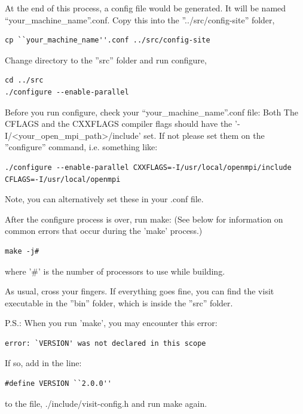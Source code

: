 \documentclass[12pt]{article}
\begin{document}
At the end of this process, a config file would be generated. It will
be named ``your\_machine\_name''.conf. Copy this into the
''../src/config-site'' folder,

\begin{verbatim}
cp ``your_machine_name''.conf ../src/config-site
\end{verbatim}

Change directory to the ''src'' folder and run configure,

\begin{verbatim}
cd ../src
./configure --enable-parallel
\end{verbatim}

Before you run configure, check your ``your\_machine\_name''.conf
file: Both The CFLAGS and the CXXFLAGS compiler flags should have the
'-I/<your\_open\_mpi\_path>/include' set. If not please set them on the
''configure'' command, i.e. something like:

\begin{verbatim}
./configure --enable-parallel CXXFLAGS=-I/usr/local/openmpi/include CFLAGS=-I/usr/local/openmpi
\end{verbatim}

Note, you can alternatively set these in your .conf file.

After the configure process is over, run make:  (See below for
information on common errors that occur during the 'make' process.)

\begin{verbatim}
make -j#
\end{verbatim}

where '\#' is the number of processors to use while building.

As usual, cross your fingers. If everything goes fine, you can find
the visit executable in the ''bin'' folder, which is inside the
''src'' folder.

P.S.: When you run 'make', you may encounter this error:

\begin{verbatim}
error: `VERSION' was not declared in this scope
\end{verbatim}

If so, add in the line:

\begin{verbatim}
#define VERSION ``2.0.0''
\end{verbatim}

to the file, ./include/visit-config.h and run make again.
\end{document}
